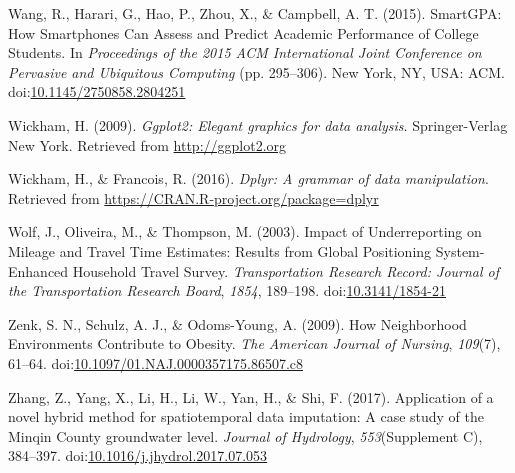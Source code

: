\documentclass[english,man]{apa6}
\theoremstyle{definition}
\theoremstyle{definition}
\theoremstyle{definition}
\theoremstyle{remark}
\begin{document}
\hypertarget{ref-wang_smartgpa:_2015}{}
Wang, R., Harari, G., Hao, P., Zhou, X., \& Campbell, A. T. (2015).
SmartGPA: How Smartphones Can Assess and Predict Academic Performance of
College Students. In \emph{Proceedings of the 2015 ACM International
Joint Conference on Pervasive and Ubiquitous Computing} (pp. 295--306).
New York, NY, USA: ACM.
doi:\href{https://doi.org/10.1145/2750858.2804251}{10.1145/2750858.2804251}

\hypertarget{ref-ggplot2}{}
Wickham, H. (2009). \emph{Ggplot2: Elegant graphics for data analysis}.
Springer-Verlag New York. Retrieved from \url{http://ggplot2.org}

\hypertarget{ref-dplyr}{}
Wickham, H., \& Francois, R. (2016). \emph{Dplyr: A grammar of data
manipulation}. Retrieved from
\url{https://CRAN.R-project.org/package=dplyr}

\hypertarget{ref-wolf_impact_2003}{}
Wolf, J., Oliveira, M., \& Thompson, M. (2003). Impact of Underreporting
on Mileage and Travel Time Estimates: Results from Global Positioning
System-Enhanced Household Travel Survey. \emph{Transportation Research
Record: Journal of the Transportation Research Board}, \emph{1854},
189--198. doi:\href{https://doi.org/10.3141/1854-21}{10.3141/1854-21}

\hypertarget{ref-zenk_how_2009}{}
Zenk, S. N., Schulz, A. J., \& Odoms-Young, A. (2009). How Neighborhood
Environments Contribute to Obesity. \emph{The American Journal of
Nursing}, \emph{109}(7), 61--64.
doi:\href{https://doi.org/10.1097/01.NAJ.0000357175.86507.c8}{10.1097/01.NAJ.0000357175.86507.c8}

\hypertarget{ref-zhang_application_2017}{}
Zhang, Z., Yang, X., Li, H., Li, W., Yan, H., \& Shi, F. (2017).
Application of a novel hybrid method for spatiotemporal data imputation:
A case study of the Minqin County groundwater level. \emph{Journal of
Hydrology}, \emph{553}(Supplement C), 384--397.
doi:\href{https://doi.org/10.1016/j.jhydrol.2017.07.053}{10.1016/j.jhydrol.2017.07.053}
\end{document}
